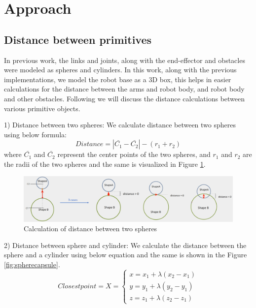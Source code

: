 \documentclass[a4paper, 11.5pt, conference]{ieeeconf}      %
\begin{document}
\section{Approach}

\subsection{Distance between primitives}
In previous work, the links and joints, along with the end-effector and obstacles were modeled as spheres and cylinders. In this work, along with the previous implementations, we model the robot base as a 3D box, this helps in easier calculations for the distance between the arms and robot body, and robot body and other obstacles. Following we will discuss the distance calculations between various primitive objects.

1) Distance between two spheres:
We calculate distance between two spheres using below formula:
\begin{equation}
	Distance = |\bar{C_1}-\bar{C_2}| - (r_1 + r_2)
\end{equation}
where $\bar{C_1}$ and $\bar{C_2}$ represent the center points of the two spheres, and $r_1$ and $r_2$ are the radii of the two spheres and the same is visualized in Figure \ref{fig:sphere_sphere}.

\begin{figure}[H]
    \centering
    \includegraphics[scale=0.23]{images/sphere_sphere.png}
    \caption{Calculation of distance between two spheres}
    \label{fig:sphere_sphere}
\end{figure}

2) Distance between sphere and cylinder:
We calculate the distance between the sphere and a cylinder using below equation and the same is shown in the Figure \ref{fig:spherecapsule}.
\begin{equation}
	Closest point = X = 	\begin{cases}
        x = x_1 + \lambda(x_2 - x_1) \\
        y = y_1 + \lambda(y_2 - y_1) \\
        z = z_1 + \lambda(z_2 - z_1) 
    \end{cases}
    \label{eq:cpcyl}
\end{equation}
\end{document}
